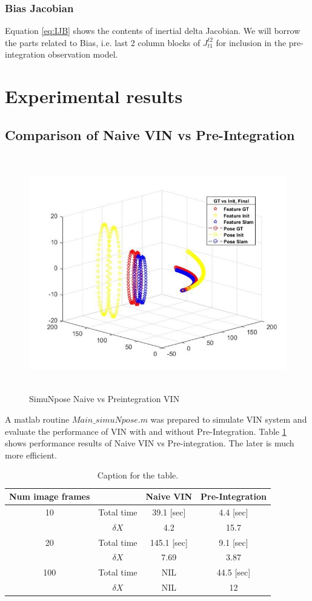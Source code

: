 \documentclass[12pt]{article}   %
\begin{document}
\subsubsection{Bias Jacobian}
Equation \ref{eq:IJB} shows the contents of inertial delta Jacobian. We will borrow the parts related to Bias, i.e. last 2 column blocks of $J_{t1}^{t2}$ for inclusion in the pre-integration observation model.

\section{Experimental results}
\subsection{Comparison of Naive VIN vs Pre-Integration}

\begin{figure}[ht!]
	\includegraphics[height=10.3cm]{figures/SimuNpose_simData.jpg}
	\caption{SimuNpose Naive vs Preintegration VIN}
	\label{fig:simuNpose}
\end{figure}

A matlab routine $Main\_simuNpose.m$ was prepared to simulate VIN system and evaluate the performance of VIN with and without Pre-Integration.
Table \ref{tab:table1} shows performance results of Naive VIN vs Pre-integration. The later is much more efficient.
\begin{table}[h!]
	\centering
	\caption{Caption for the table.}
	\begin{tabular}{cc|c|c}
		Num image frames &  & Naive VIN & Pre-Integration\\
		\hline
		10 & Total time & 39.1 [sec] & 4.4 [sec]\\
		{} & $\delta X$ & 4.2 & 15.7\\
		\hline
		20 & Total time & 145.1 [sec] & 9.1 [sec]\\
		{} & $\delta X$ & 7.69 & 3.87\\
		\hline
		100 & Total time & NIL & 44.5 [sec]\\
		{} & $\delta X$ & NIL & 12\\		
	\end{tabular}
	\label{tab:table1}
\end{table}
\end{document}

